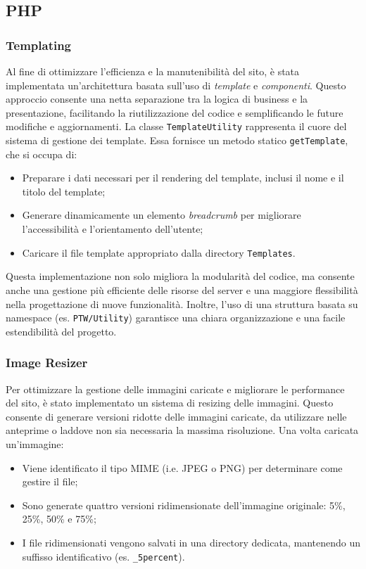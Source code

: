 \subsection{PHP}
\subsubsection{Templating}
Al fine di ottimizzare l'efficienza e la manutenibilit\`a del sito, \`e stata implementata un'architettura basata sull'uso di \textit{template} e \textit{componenti}. Questo approccio consente una netta separazione tra la logica di business e la presentazione, facilitando la riutilizzazione del codice e semplificando le future modifiche e aggiornamenti.
La classe \texttt{TemplateUtility} rappresenta il cuore del sistema di gestione dei template. Essa fornisce un metodo statico \texttt{getTemplate}, che si occupa di:
\begin{itemize}
\item Preparare i dati necessari per il rendering del template, inclusi il nome e il titolo del template;
\item Generare dinamicamente un elemento \textit{breadcrumb} per migliorare l'accessibilit\`a e l'orientamento dell'utente;
\item Caricare il file template appropriato dalla directory \texttt{Templates}.
\end{itemize}

Questa implementazione non solo migliora la modularit\`a del codice, ma consente anche una gestione pi\`u efficiente delle risorse del server e una maggiore flessibilit\`a nella progettazione di nuove funzionalit\`a. Inoltre, l'uso di una struttura basata su namespace (es. \texttt{PTW/Utility}) garantisce una chiara organizzazione e una facile estendibilit\`a del progetto.

\subsubsection{Image Resizer}
Per ottimizzare la gestione delle immagini caricate e migliorare le performance del sito, \`e stato implementato un sistema di resizing delle immagini. Questo consente di generare versioni ridotte delle immagini caricate, da utilizzare nelle anteprime o laddove non sia necessaria la massima risoluzione.
Una volta caricata un'immagine:
\begin{itemize}
    \item Viene identificato il tipo MIME (i.e. JPEG o PNG) per determinare come gestire il file;
    \item Sono generate quattro versioni ridimensionate dell'immagine originale: 5\%, 25\%, 50\% e 75\%;
    \item I file ridimensionati vengono salvati in una directory dedicata, mantenendo un suffisso identificativo (es. \texttt{\_5percent}).
\end{itemize}

